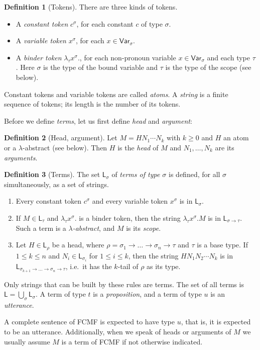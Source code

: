 \documentclass[11pt,a4paper]{article}
\theoremstyle{definition}
\newtheorem{definition}{Definition}[section]
\theoremstyle{plain}
\newcommand{\Var}{\mathsf{Var}}
\newcommand{\Lang}{\mathsf{L}}
\begin{document}
\begin{definition}[Tokens]
There are three kinds of tokens.
\begin{itemize}[itemsep=0pt]
  \item A \emph{constant token} $c^\sigma$, for each constant $c$ of type $\sigma$.
  \item A \emph{variable token} $x^\sigma$, for each $x\in\Var_\sigma$.
  \item A \emph{binder token} $\lambda_\tau x^\sigma.$, for each non-pronoun variable $x\in\Var_\sigma$ and each type $\tau$. Here $\sigma$ is the type of the bound variable and $\tau$ is the type of the scope (see below).
\end{itemize}
Constant tokens and variable tokens are called \emph{atoms}. A \emph{string} is a finite sequence of tokens; its length is the number of its tokens.
\end{definition}
Before we define \textit{terms}, let us first define \textit{head} and \textit{argument}:

\begin{definition}[Head, argument]
Let $M=HN_1\cdots N_k$ with $k\ge0$ and $H$ an atom or a $\lambda$-abstract (see below). Then $H$ is the \emph{head} of $M$ and $N_1,\dots,N_k$ are its \emph{arguments}. 
\end{definition}

\begin{definition}[Terms]\label{def:terms}
The set $\Lang_\sigma$ of \emph{terms of type $\sigma$} is defined, for all $\sigma$ simultaneously, as a set of strings. 
\begin{enumerate}[label=(T\arabic*),itemsep=0pt]
  \item Every constant token $c^\sigma$ and every variable token $x^\sigma$ is in $\Lang_\sigma$.
  \item If $M\in\Lang_\tau$ and $\lambda_\tau x^\sigma.$ is a binder token, then the string $\lambda_\tau x^\sigma. M$ is in $\Lang_{\sigma\to\tau}$. Such a term is a \emph{$\lambda$-abstract}, and $M$ is its \emph{scope}.
  \item Let $H\in\Lang_\rho$ be a head, where $\rho=\sigma_1\to\dots\to\sigma_n\to\tau$ and $\tau$ is a base type. If $1\le k\le n$ and $N_i\in\Lang_{\sigma_i}$ for $1\le i\le k$, then the string $HN_1N_2\cdots N_k$ is in $\Lang_{\sigma_{k+1}\to\dots\to\sigma_n\to\tau}$, i.e.\ it has the $k$-tail of $\rho$ as its type.
\end{enumerate}
Only strings that can be built by these rules are terms. The set of all terms is $\Lang=\bigcup_\sigma\Lang_\sigma$. A term of type $t$ is a \emph{proposition}, and a term of type $u$ is an \emph{utterance}. 
\end{definition}
A complete sentence of FCMF is expected to have type $u$, that is, it is expected to be an utterance. Additionally, when we speak of heads or arguments of $M$ we usually assume $M$ is a term of FCMF if not otherwise indicated. 
\end{document}
